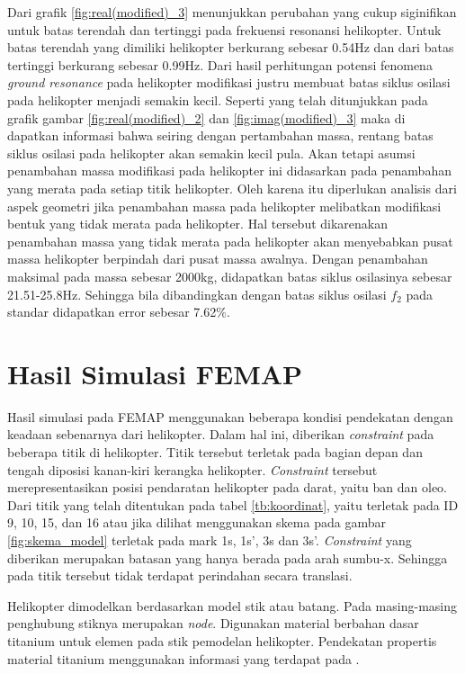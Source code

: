 Dari grafik \ref{fig:real(modified)_3} menunjukkan perubahan yang cukup siginifikan untuk batas terendah dan tertinggi pada frekuensi resonansi helikopter. Untuk batas terendah yang dimiliki helikopter berkurang sebesar 0.54Hz dan dari batas tertinggi berkurang sebesar 0.99Hz. Dari hasil perhitungan potensi fenomena \textit{ground resonance} pada helikopter modifikasi justru membuat batas siklus osilasi pada helikopter menjadi semakin kecil. Seperti yang telah ditunjukkan pada grafik gambar \ref{fig:real(modified)_2} dan \ref{fig:imag(modified)_3} maka di dapatkan informasi bahwa seiring dengan pertambahan massa, rentang batas siklus osilasi pada helikopter akan semakin kecil pula. Akan tetapi asumsi penambahan massa modifikasi pada helikopter ini didasarkan pada penambahan yang merata pada setiap titik helikopter. Oleh karena itu diperlukan analisis dari aspek geometri jika penambahan massa pada helikopter melibatkan modifikasi bentuk yang tidak merata pada helikopter. Hal tersebut dikarenakan penambahan massa yang tidak merata pada helikopter akan menyebabkan pusat massa helikopter berpindah dari pusat massa awalnya. Dengan penambahan maksimal pada massa sebesar 2000kg, didapatkan batas siklus osilasinya sebesar 21.51-25.8Hz. Sehingga bila dibandingkan dengan batas siklus osilasi $f_2$ pada standar didapatkan error sebesar 7.62$\%$.

\section{Hasil Simulasi FEMAP}

Hasil simulasi pada FEMAP menggunakan beberapa kondisi pendekatan dengan keadaan sebenarnya dari helikopter. Dalam hal ini, diberikan \textit{constraint} pada beberapa titik di helikopter. Titik tersebut terletak pada bagian depan dan tengah diposisi kanan-kiri kerangka helikopter. \textit{Constraint} tersebut merepresentasikan posisi pendaratan helikopter pada darat, yaitu ban dan oleo. Dari titik yang telah ditentukan pada tabel \ref{tb:koordinat}, yaitu terletak pada ID 9, 10, 15, dan 16 atau jika dilihat menggunakan skema pada gambar \ref{fig:skema_model} terletak pada mark 1s, 1s', 3s dan 3s'. \textit{Constraint} yang diberikan merupakan batasan yang hanya berada pada arah sumbu-x. Sehingga pada titik tersebut tidak terdapat perindahan secara translasi.

Helikopter dimodelkan berdasarkan model stik atau batang. Pada masing-masing penghubung stiknya merupakan \textit{node}. Digunakan material berbahan dasar titanium untuk elemen pada stik pemodelan helikopter. Pendekatan propertis material titanium menggunakan informasi yang terdapat pada \cite{ASTM}.

